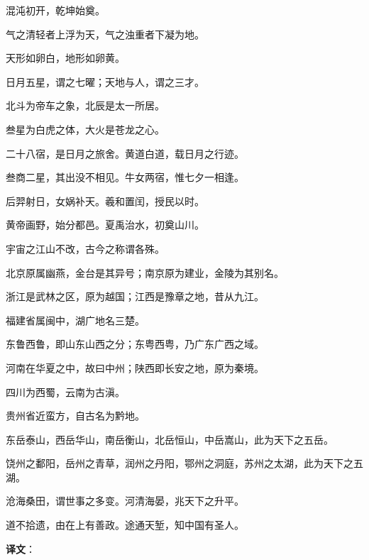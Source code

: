 \documentclass[12pt,UTF-8,openany,a4]{ctexbook}
\begin{document}
\begin{large}
    
    混沌初开，乾坤始奠。
    
    气之清轻者上浮为天，气之浊重者下凝为地。
    
    天形如卵白，地形如卵黄。
    
    日月五星，谓之七曜；天地与人，谓之三才。
    
    北斗为帝车之象，北辰是太一所居。
    
    叁星为白虎之体，大火是苍龙之心。
    
    二十八宿，是日月之旅舍。黄道白道，载日月之行迹。
    
    叁商二星，其出没不相见。牛女两宿，惟七夕一相逢。
    
    后羿射日，女娲补天。羲和置闰，授民以时。
    
    黄帝画野，始分都邑。夏禹治水，初奠山川。
    
    宇宙之江山不改，古今之称谓各殊。
    
    北京原属幽燕，金台是其异号；南京原为建业，金陵为其别名。
    
    浙江是武林之区，原为越国；江西是豫章之地，昔从九江。
    
    福建省属闽中，湖广地名三楚。
    
    东鲁西鲁，即山东山西之分；东粤西粤，乃广东广西之域。
    
    河南在华夏之中，故曰中州；陕西即长安之地，原为秦境。
    
    四川为西蜀，云南为古滇。
    
    贵州省近蛮方，自古名为黔地。
    
    东岳泰山，西岳华山，南岳衡山，北岳恒山，中岳嵩山，此为天下之五岳。
    
    饶州之鄱阳，岳州之青草，润州之丹阳，鄂州之洞庭，苏州之太湖，此为天下之五湖。
    
    沧海桑田，谓世事之多变。河清海晏，兆天下之升平。
    
    道不拾遗，由在上有善政。途通天堑，知中国有圣人。

\end{large}


\newpage

\begin{Large}
   \noindent \textbf{译文}：
\end{Large}

\vspace{1em}
\end{document}
